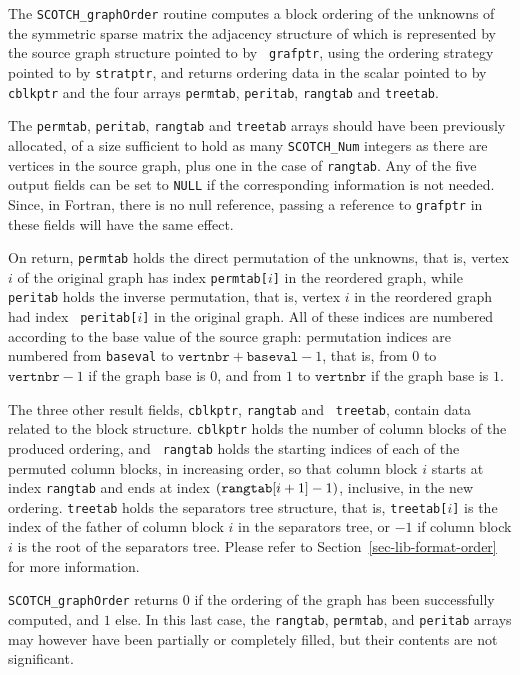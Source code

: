 \begin{itemize}
The {\tt SCOTCH\_graphOrder} routine computes a block ordering of the
unknowns of the symmetric sparse matrix the adjacency structure of
which is represented by the source graph structure pointed to by {\tt
grafptr}, using the ordering strategy pointed to by {\tt stratptr},
and returns ordering data in the scalar pointed to by {\tt cblkptr}
and the four arrays {\tt permtab}, {\tt peritab}, {\tt rangtab} and
{\tt treetab}.

The {\tt permtab}, {\tt peritab}, {\tt rangtab} and {\tt treetab}
arrays should have been previously allocated, of a size sufficient to
hold as many {\tt SCOTCH\_\lbt Num} integers as there are vertices in
the source graph, plus one in the case of {\tt rangtab}. Any of the
five output fields can be set to {\tt NULL} if the corresponding
information is not needed. Since, in Fortran, there is no null
reference, passing a reference to {\tt grafptr} in these fields will
have the same effect.

On return, {\tt permtab} holds the direct permutation of the unknowns,
that is, vertex $i$ of the original graph has index {\tt permtab[$i$]}
in the reordered graph, while {\tt peritab} holds the inverse
permutation, that is, vertex $i$ in the reordered graph had index {\tt
peritab[$i$]} in the original graph. All of these indices are numbered
according to the base value of the source graph: permutation indices
are numbered from {\tt baseval} to
$\mathtt{vertnbr} + \mathtt{baseval} - 1$, that is,
from $0$ to $\mathtt{vertnbr} - 1$ if the graph base is
$0$, and from $1$ to $\mathtt{vertnbr}$ if the graph base is $1$.

The three other result fields, {\tt *cblkptr}, {\tt rangtab} and {\tt
treetab}, contain data related to the block structure. {\tt *cblkptr}
holds the number of column blocks of the produced ordering, and {\tt
rangtab} holds the starting indices of each of the permuted column
blocks, in increasing order, so that column block $i$ starts at index
{\tt rangtab\lbt [$i$]} and ends at index $(\mbox{\tt
rangtab}\lbt\mathtt{[}i + 1\mathtt{]} - 1)$, inclusive, in the new
ordering. {\tt treetab} holds the separators tree structure, that is,
{\tt treetab[$i$]} is the index of the father of column block $i$ in
the separators tree, or $-1$ if column block $i$ is the root of the
separators tree. Please refer to Section~\ref{sec-lib-format-order}
for more information.

\progret

{\tt SCOTCH\_graphOrder} returns $0$ if the ordering of the graph has
been successfully computed, and $1$ else. In this last case, the
{\tt rangtab}, {\tt permtab}, and {\tt peritab} arrays may however have
been partially or completely filled, but their contents are not significant.
\end{itemize}

